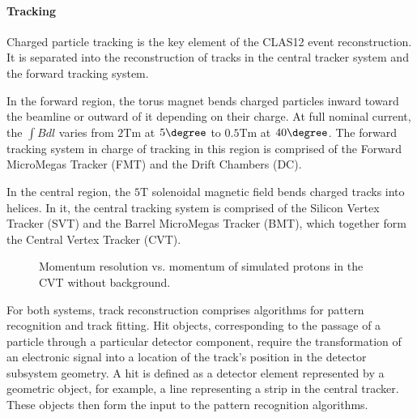 \paragraph{Tracking}
    Charged particle tracking is the key element of the CLAS12 event reconstruction.
    It is separated into the reconstruction of tracks in the central tracker system and the forward tracking system.

    In the forward region, the torus magnet bends charged particles inward toward the beamline or outward of it depending on their charge.
    At full nominal current, the $\int Bdl$ varies from $2 \text{Tm}$ at $5\degree$ to $0.5 \text{Tm}$ at $40\degree$.
    The forward tracking system in charge of tracking in this region is comprised of the Forward MicroMegas Tracker (FMT) and the Drift Chambers (DC).

    In the central region, the $5 \text{T}$ solenoidal magnetic field bends charged tracks into helices.
    In it, the central tracking system is comprised of the Silicon Vertex Tracker (SVT) and the Barrel MicroMegas Tracker (BMT), which together form the Central Vertex Tracker (CVT).

    \begin{figure}
        \centering{}
        \caption[CVT momentum resolution vs. momentum.]{Momentum resolution vs. momentum of simulated protons in the CVT without background.}
        \label{fig::cvt_pres}
    \end{figure}

    For both systems, track reconstruction comprises algorithms for pattern recognition and track fitting. Hit objects, corresponding to the passage of a particle through a particular detector component, require the transformation of an electronic signal into a location of the track’s
    position in the detector subsystem geometry.
    A hit is defined as a detector element represented by a geometric object, for example, a line representing a strip in the central tracker.
    These objects then form the input to the pattern recognition algorithms.

